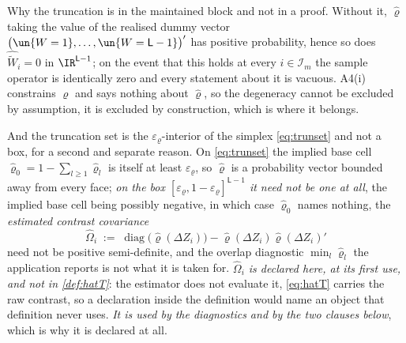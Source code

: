 Why the truncation is in the maintained block and not in a proof. Without it, $\hat\varrho$
taking the value of the realised dummy vector $\big(\un\{W=1\},\dots,\un\{W=\mathsf L-1\}\big)'$ has
positive probability, hence so does $\widehat{\widetilde W}_i=0$ in $\IR^{\mathsf L-1}$; on the
event that this holds at every $i\in\mathcal I_m$ the sample operator is identically zero and every
statement about it is vacuous. A4(i) constrains $\varrho$ and says nothing about
$\hat\varrho$, so the degeneracy cannot be excluded by assumption, it is excluded by construction,
which is where it belongs.

And the truncation set is the $\varepsilon_\varrho$-interior of the simplex \eqref{eq:trunset} and
not a box, for a second and separate reason. On \eqref{eq:trunset} the implied base cell
$\hat\varrho_0=1-\sum_{l\ge1}\hat\varrho_l$ is itself at least $\varepsilon_\varrho$, so $\hat\varrho$ is
a probability vector bounded away from every face; \emph{on the box
$[\varepsilon_\varrho,1-\varepsilon_\varrho]^{\mathsf L-1}$ it need not be one at all}, the implied base
cell being possibly negative, in which case $\hat\varrho_0$ names nothing, the \emph{estimated contrast
covariance}
\[
\hat\Omega_i\;:=\;\operatorname{diag}\big(\hat\varrho(\Delta Z_i)\big)-\hat\varrho(\Delta Z_i)\hat\varrho(\Delta Z_i)'
\]
need not be
positive semi-definite, and the overlap diagnostic $\min_l\hat\varrho_l$ the application reports is not
what it is taken for. \emph{$\hat\Omega_i$ is declared here, at its first use, and not in
\cref{def:hatT}}: the estimator does not evaluate it, \eqref{eq:hatT} carries the raw contrast, so a
declaration inside the definition would name an object that definition never uses. \emph{It is used by
the diagnostics and by the two clauses below}, which is why it is declared at all.
